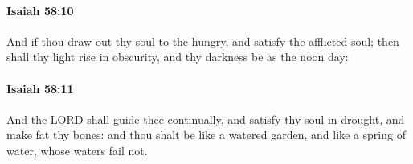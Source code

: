 		\paragraph{Isaiah 58:10} %
			\label{ISAIAH-58-10}

			And if thou draw out thy soul to the hungry, and satisfy the afflicted soul; then shall thy light rise in obscurity, and thy darkness be as the noon day:


		\paragraph{Isaiah 58:11} %
			\label{ISAIAH-58-11}

			And the LORD shall guide thee continually, and satisfy thy soul in drought, and make fat thy bones: and thou shalt be like a watered garden, and like a spring of water, whose waters fail not.


